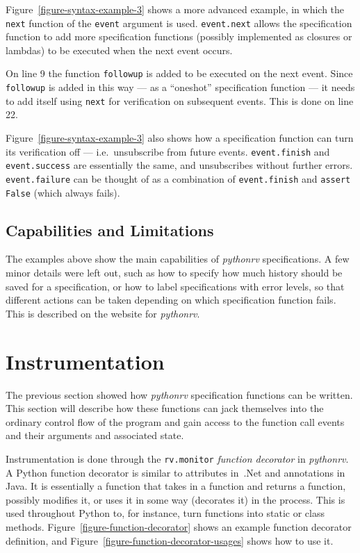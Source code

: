 \documentclass[a4paper,11pt]{kth-mag}
\theoremstyle{definition}
\begin{document}
Figure~\ref{figure-syntax-example-3} shows a more advanced example, in which
the \texttt{next} function of the \texttt{event} argument is used.
\texttt{event.next} allows the specification function to add more specification
functions (possibly implemented as closures or lambdas) to be executed when the
next event occurs.

On line 9 the function \texttt{followup} is added to be executed on the next
event. Since \texttt{followup} is added in this way --- as a ``oneshot''
specification function --- it needs to add itself using \texttt{next} for
verification on subsequent events. This is done on line 22.

Figure~\ref{figure-syntax-example-3} also shows how a specification function
can turn its verification off --- i.e.\ unsubscribe from future events.
\texttt{event.finish} and \texttt{event.success} are essentially the same, and
unsubscribes without further errors. \texttt{event.failure} can be thought of
as a combination of \texttt{event.finish} and \texttt{assert False} (which
always fails).


\subsection{Capabilities and Limitations}

The examples above show the main capabilities of \textit{pythonrv}
specifications. A few minor details were left out, such as how to specify how
much history should be saved for a specification, or how to label
specifications with error levels, so that different actions can be taken
depending on which specification function fails. This is described on the website for
\textit{pythonrv}.


\section{Instrumentation} \label{section-approach-instrumentation}

The previous section showed how \textit{pythonrv} specification functions can
be written. This section will describe how these functions can jack themselves
into the ordinary control flow of the program and gain access to the function
call events and their arguments and associated state.

Instrumentation is done through the \texttt{rv.monitor} \textit{function
decorator} in \textit{pythonrv}. A Python function decorator is similar to
attributes in~.Net and annotations in Java. It is essentially a function that
takes in a function and returns a function, possibly modifies it, or uses it in
some way (decorates it) in the process. This is used throughout Python to, for
instance, turn functions into static or class methods.
Figure~\ref{figure-function-decorator} shows an example function decorator
definition, and Figure~\ref{figure-function-decorator-usages} shows how to use
it.
\end{document}
